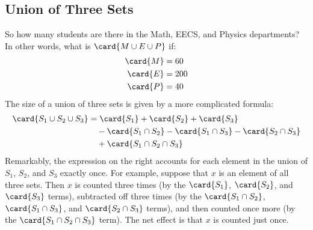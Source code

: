 \iffalse
$S_1$ into the elements prove equation~\eqref{IE2} rigorously by applying
the Sum Rule to some disjoint subsets of $S_1 \union S_2$.  As a first
step, we observe that given any two sets, $S,T$, we can decompose $S$ into
the disjoint sets consisting of those elements in $S$ but not $T$, and
those elements in $S$ and also in $T$.  That is, $S$ is the union of the
disjoint sets $S-T$ and $S \intersect T$.  So by the Sum Rule we have
\begin{align}
\card{S} & = \card{S-T} + \card{S \intersect T}, & \text{and so}\notag\\
\card{S-T} & = \card{S} - \card{S \intersect T}.\label{s-t}
\end{align}
Now we decompose $S_1 \union S_2$ into three disjoint sets:
\begin{equation}\label{sin3}
S_1 \cup S_2
     = (S_1 - S_2) \cup (S_2 - S_1) \cup (S_1 \cap S_2).
\end{equation}
Now we have
\begin{align*}
\card{S_1 \cup S_2}
    & = \card{(S_1 - S_2) \cup (S_2 - S_1) \cup (S_1 \cap S_2)}
        && \text{(by~\eqref{sin3})} \\
    & = \card{S_1 - S_2} + \card{S_2 - S_1} + \card{S_1 \cap S_2}
        && \text{(Sum Rule)} \\
    & = (\card{S_1} - \card{S_1 \cap S_2})
      + (\card{S_2} - \card{S_1 \cap S_2})
      + \card{S_1 \cap S_2}
        && \text{(by~\eqref{s-t})} \\
    & = \card{S_1} + \card{S_2} - \card{S_1 \cap S_2}
        && \text{(algebra)}
\end{align*}
\fi


\subsection{Union of Three Sets}

So how many students are there in the Math, EECS, and Physics
departments?  In other words, what is $\card{M \cup E \cup P}$ if:
%
\begin{align*}
\card{M} & = 60 \\
\card{E} & = 200 \\
\card{P} & = 40
\end{align*}
%
The size of a union of three sets is given by a more complicated
 formula:
%
\begin{align*}
\card{S_1 \cup S_2 \cup S_3} & = \card{S_1} + \card{S_2} + \card{S_3} \\
  & \quad - \card{S_1 \cap S_2} - \card{S_1 \cap S_3} - \card{S_2 \cap S_3} \\
  & \quad + \card{S_1 \cap S_2 \cap S_3}
\end{align*}
%
Remarkably, the expression on the right accounts for each element in the
union of $S_1$, $S_2$, and $S_3$ exactly once.  For example, suppose that
$x$ is an element of all three sets.  Then $x$ is counted three times (by
the $\card{S_1}$, $\card{S_2}$, and $\card{S_3}$ terms), subtracted off
three times (by the $\card{S_1 \cap S_2}$, $\card{S_1 \cap S_3}$, and
$\card{S_2 \cap S_3}$ terms), and then counted once more (by the
$\card{S_1 \cap S_2 \cap S_3}$ term).  The net effect is that $x$ is
counted just once.

